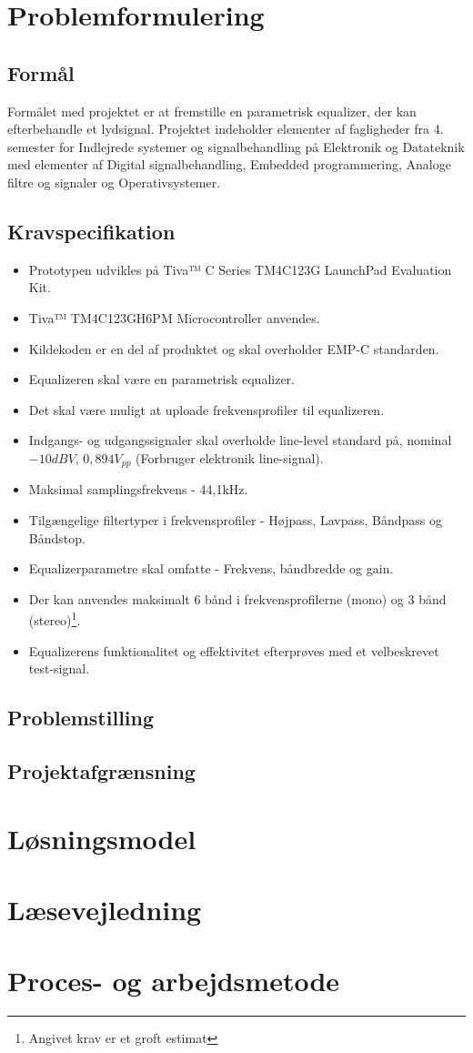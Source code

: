 
\section{Problemformulering}

\subsection{Formål}
Formålet med projektet er at fremstille en parametrisk equalizer, der kan efterbehandle et lydsignal.
Projektet indeholder elementer af fagligheder fra 4. semester for Indlejrede systemer og signalbehandling på Elektronik og Datateknik med elementer af Digital signalbehandling, Embedded programmering, Analoge filtre og signaler og Operativsystemer.

\subsection{Kravspecifikation} \label{afs:kravspecifikation}
\begin{itemize}
	\item Prototypen udvikles på Tiva™ C Series TM4C123G LaunchPad Evaluation Kit.
	\item Tiva™ TM4C123GH6PM Microcontroller anvendes.
	\item Kildekoden er en del af produktet og skal overholder EMP-C standarden.
	\item Equalizeren skal være en parametrisk equalizer.
	\item Det skal være muligt at uploade frekvensprofiler til equalizeren.
	\item Indgangs- og udgangssignaler skal overholde line-level standard på, nominal $-10 dBV$, $0,894 V_{pp}$ (Forbruger elektronik line-signal).
	\item Maksimal samplingsfrekvens - 44,1kHz.
	\item Tilgængelige filtertyper i frekvensprofiler - Højpass, Lavpass, Båndpass og Båndstop.
	\item Equalizerparametre skal omfatte - Frekvens, båndbredde og gain.
	\item Der kan anvendes maksimalt 6 bånd i frekvensprofilerne (mono) og 3 bånd (stereo)\footnote{Angivet krav er et groft estimat}.   
	\item Equalizerens funktionalitet og effektivitet efterprøves med et velbeskrevet test-signal.
\end{itemize}

\subsection{Problemstilling}

\subsection{Projektafgrænsning}

\section{Løsningsmodel}

\section{Læsevejledning}

\section{Proces- og arbejdsmetode}
